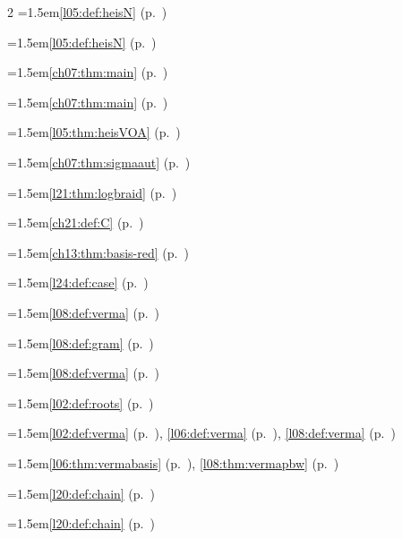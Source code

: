 \begin{multicols}{2}
\hangindent=1.5em\quad \ref{l05:def:heisN} (p.~\pageref{l05:def:heisN})\par
\hangindent=1.5em\quad \ref{l05:def:heisN} (p.~\pageref{l05:def:heisN})\par
\hangindent=1.5em\quad \ref{ch07:thm:main} (p.~\pageref{ch07:thm:main})\par
\hangindent=1.5em\quad \ref{ch07:thm:main} (p.~\pageref{ch07:thm:main})\par
\hangindent=1.5em\quad \ref{l05:thm:heisVOA} (p.~\pageref{l05:thm:heisVOA})\par
\hangindent=1.5em\quad \ref{ch07:thm:sigmaaut} (p.~\pageref{ch07:thm:sigmaaut})\par
\hangindent=1.5em\quad \ref{l21:thm:logbraid} (p.~\pageref{l21:thm:logbraid})\par
\hangindent=1.5em\quad \ref{ch21:def:C} (p.~\pageref{ch21:def:C})\par
\hangindent=1.5em\quad \ref{ch13:thm:basis-red} (p.~\pageref{ch13:thm:basis-red})\par
\hangindent=1.5em\quad \ref{l24:def:case} (p.~\pageref{l24:def:case})\par
\hangindent=1.5em\quad \ref{l08:def:verma} (p.~\pageref{l08:def:verma})\par
\hangindent=1.5em\quad \ref{l08:def:gram} (p.~\pageref{l08:def:gram})\par
\hangindent=1.5em\quad \ref{l08:def:verma} (p.~\pageref{l08:def:verma})\par
\hangindent=1.5em\quad \ref{l02:def:roots} (p.~\pageref{l02:def:roots})\par
\hangindent=1.5em\quad \ref{l02:def:verma} (p.~\pageref{l02:def:verma}), \ref{l06:def:verma} (p.~\pageref{l06:def:verma}), \ref{l08:def:verma} (p.~\pageref{l08:def:verma})\par
\hangindent=1.5em\quad \ref{l06:thm:vermabasis} (p.~\pageref{l06:thm:vermabasis}), \ref{l08:thm:vermapbw} (p.~\pageref{l08:thm:vermapbw})\par
\hangindent=1.5em\quad \ref{l20:def:chain} (p.~\pageref{l20:def:chain})\par
\hangindent=1.5em\quad \ref{l20:def:chain} (p.~\pageref{l20:def:chain})\par

\end{multicols}
